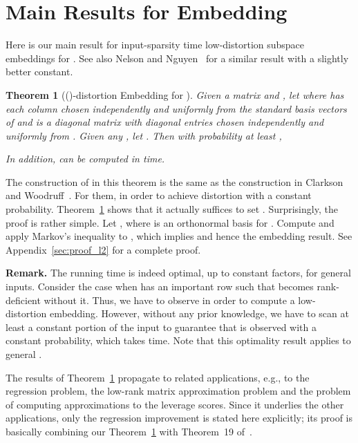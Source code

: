 \documentclass[11pt]{article}
\newtheorem{theorem}{Theorem}
\begin{document}
\section{Main Results for  Embedding}
\label{sxn:l2} 

Here is our main result for input-sparsity time low-distortion subspace
embeddings for .
See also Nelson and Nguyen~\cite{nelson2012osnap} for a similar result with a
slightly better constant.

\begin{theorem}[()-distortion Embedding for ]
  \label{thm:sparse_l2}
  Given a matrix  and , let  where  has each column chosen independently and
  uniformly from the  standard basis vectors of  and  is a diagonal matrix with diagonal entries chosen independently
  and uniformly from .
  Given any , let .
  Then with probability at least ,
  
  In addition,  can be computed in  time.
\end{theorem}

\noindent
The construction of  in this theorem is the same as the construction in
Clarkson and Woodruff~\cite{CW12sparse_TR}.
For them,  in order to achieve  distortion with a constant probability. 
Theorem~\ref{thm:sparse_l2} shows that it actually suffices to set .
Surprisingly, the proof is rather simple.
Let , where  is an orthonormal basis for .
Compute  and apply Markov's inequality to , which implies  and hence
the embedding result.
See Appendix~\ref{sec:proof_l2} for a complete proof. 

\noindent
\textbf{Remark.} 
The  running time is indeed optimal, up to constant factors, 
for general inputs.
Consider the case when  has an important row  such that  becomes
rank-deficient without it.
Thus, we have to observe  in order to compute a low-distortion embedding.
However, without any prior knowledge, we have to scan at least a constant
portion of the input to guarantee that  is observed with a constant
probability, which takes  time.
Note that this optimality result applies to general .

The results of Theorem~\ref{thm:sparse_l2} propagate to related applications,
e.g., to the  regression problem, the low-rank matrix approximation
problem and the problem of computing approximations to the  leverage
scores.
Since it underlies the other applications, only the  regression
improvement is stated here explicitly; its proof is basically combining our
Theorem~\ref{thm:sparse_l2} with Theorem~19 of~\cite{CW12sparse_TR}.
\end{document}
